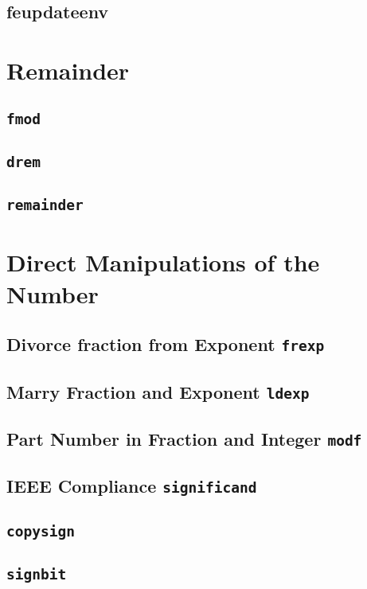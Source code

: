 \documentclass[a4paper]{book}
\theoremstyle{definition}
\theoremstyle{remark}
\begin{document}
\subsection{feupdateenv}
\subsection{}



\section{Remainder}
\subsection{{\texttt{fmod}}}
\subsection{{\texttt{drem}}}
\subsection{{\texttt{remainder}}}


\section{Direct Manipulations of the Number}
\subsection{Divorce fraction from Exponent {\texttt{frexp}}}
\subsection{Marry Fraction and Exponent {\texttt{ldexp}}}
\subsection{Part Number in Fraction and Integer {\texttt{modf}}}
\subsection{IEEE Compliance {\texttt{significand}}}

\subsection{{\texttt{copysign}}}
\subsection{{\texttt{signbit}}}
\end{document}
